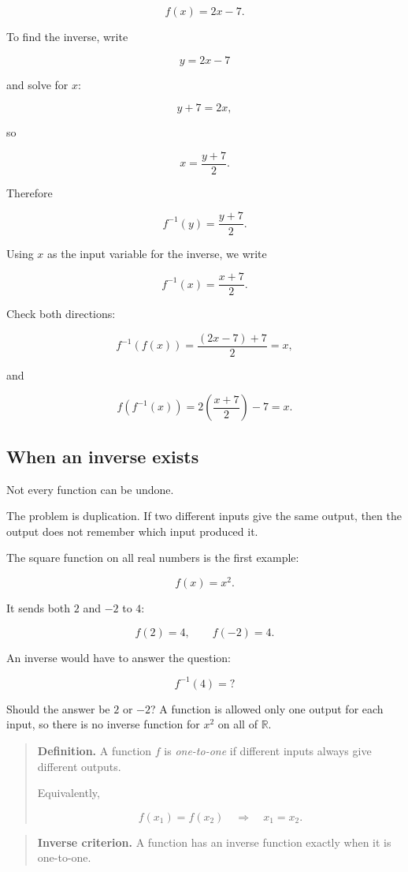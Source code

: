 \[
f(x)=2x-7.
\]

To find the inverse, write

\[
y=2x-7
\]

and solve for \(x\):

\[
y+7=2x,
\]

so

\[
x=\frac{y+7}{2}.
\]

Therefore

\[
f^{-1}(y)=\frac{y+7}{2}.
\]

Using \(x\) as the input variable for the inverse, we write

\[
f^{-1}(x)=\frac{x+7}{2}.
\]

Check both directions:

\[
f^{-1}(f(x))
=
\frac{(2x-7)+7}{2}
=
x,
\]

and

\[
f(f^{-1}(x))
=
2\left(\frac{x+7}{2}\right)-7
=
x.
\]

\subsection{When an inverse exists}
\label{subsec:when-inverse-exists}

Not every function can be undone.

The problem is duplication. If two different inputs give the same output, then the output does not remember which input produced it.

The square function on all real numbers is the first example:

\[
f(x)=x^2.
\]

It sends both \(2\) and \(-2\) to \(4\):

\[
f(2)=4,
\qquad
f(-2)=4.
\]

An inverse would have to answer the question:

\[
f^{-1}(4)=?
\]

Should the answer be \(2\) or \(-2\)? A function is allowed only one output for each input, so there is no inverse function for \(x^2\) on all of \(\mathbb R\).

\begin{quote}
\textbf{Definition.}
A function \(f\) is \emph{one-to-one} if different inputs always give different outputs.

Equivalently,

\[
f(x_1)=f(x_2)
\quad\Longrightarrow\quad
x_1=x_2.
\]
\end{quote}

\begin{quote}
\textbf{Inverse criterion.}
A function has an inverse function exactly when it is one-to-one.
\end{quote}

